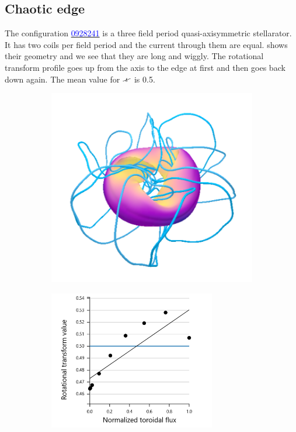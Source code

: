 \subsection{Chaotic edge}\label{sec:quars-0928241}

The configuration \href{https://quasr.flatironinstitute.org/model/0928241}{\textcolor{blue}{0928241}} is a three field period quasi-axisymmetric stellarator. It has two coils per field period and the current through them are equal.  shows their geometry and we see that they are long and wiggly. The rotational transform profile  goes up from the axis to the edge at first and then goes back down again. The mean value for $\iotaslash$ is 0.5.

\begin{figure}[H]
    \centering
    \begin{subfigure}[t]{0.47\textwidth}
        \centering
        \includegraphics[width=\textwidth]{images/quasrs/config-0928241.png}
        \caption{}
        \label{fig:coils-0928241}
    \end{subfigure}
    \hfill
    \begin{subfigure}[t]{0.52\textwidth}
        \centering
        \includegraphics[width=0.8\textwidth]{images/quasrs/iota-0928241.png}

\end{subfigure}
\end{figure}
